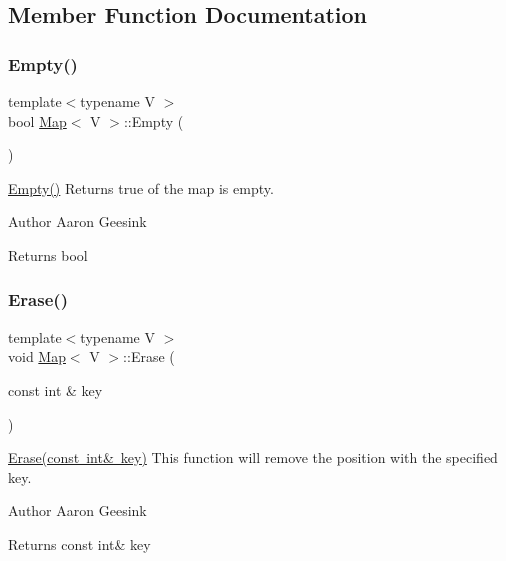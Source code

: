\subsection{Member Function Documentation}
\mbox{\label{class_map_a842c78e12564c5d4248efddf0a0dd218}} 
\subsubsection{\texorpdfstring{Empty()}{Empty()}}
{\footnotesize\ttfamily template$<$typename V $>$ \\
bool \mbox{\hyperlink{class_map}{Map}}$<$ V $>$\+::Empty (\begin{DoxyParamCaption}{ }\end{DoxyParamCaption})}



\mbox{\hyperlink{class_map_a842c78e12564c5d4248efddf0a0dd218}{Empty()}} Returns true of the map is empty. 

\begin{DoxyAuthor}{Author}
Aaron Geesink 
\end{DoxyAuthor}
\begin{DoxyReturn}{Returns}
bool 
\end{DoxyReturn}
\mbox{\label{class_map_a6ab297193740409c74ad10cfb9116e8b}} 
\subsubsection{\texorpdfstring{Erase()}{Erase()}}
{\footnotesize\ttfamily template$<$typename V $>$ \\
void \mbox{\hyperlink{class_map}{Map}}$<$ V $>$\+::Erase (\begin{DoxyParamCaption}\item[{const int \&}]{key }\end{DoxyParamCaption})}



\mbox{\hyperlink{class_map_a6ab297193740409c74ad10cfb9116e8b}{Erase(const int\& key)}} This function will remove the position with the specified key. 

\begin{DoxyAuthor}{Author}
Aaron Geesink 
\end{DoxyAuthor}
\begin{DoxyReturn}{Returns}
const int\& key 
\end{DoxyReturn}
\mbox{\label{class_map_a5a4498cca2ab6536d04915f07ca5f01f}} 
